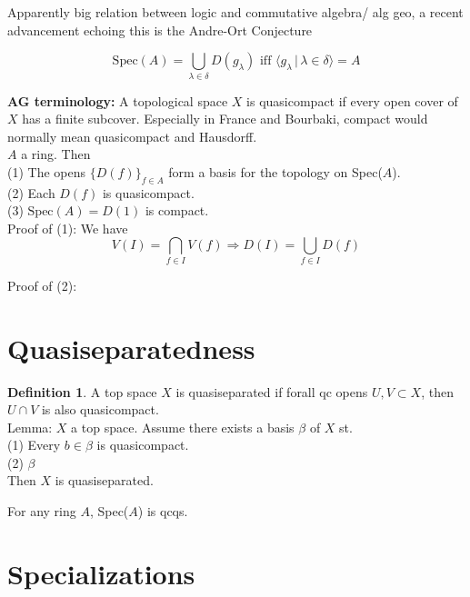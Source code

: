 \documentclass{article}
\theoremstyle{definition}
\theoremstyle{definition}
\newtheorem{definition}{Definition}[section]
\theoremstyle{remark}
\newcommand{\ic}{\cap}
\begin{document}
Apparently big relation between logic and commutative algebra/ alg geo, a recent advancement echoing this is the Andre-Ort Conjecture

\begin{coroll}{}{}
	\[\text{Spec}(A) = \bigcup_{\lambda \in \delta} D(g_{\lambda}) \text{ iff } \langle g_{\lambda} \, |\, \lambda \in \delta\rangle = A\]
\end{coroll}

\textbf{AG terminology: } A topological space $X$ is quasicompact if every open cover of $X$ has a finite subcover.
Especially in France and Bourbaki, compact would normally mean quasicompact and Hausdorff.\\

$A$ a ring. Then \\
\indent (1) The opens $\{D(f)\}_{f \in A}$ form a basis for the topology on Spec($A$).\\
\indent (2) Each $D(f)$ is quasicompact.\\
\indent (3) $\text{Spec}(A) = D(1)$ is compact.\\

Proof of (1): We have 
	\[V(I) = \bigcap_{f \in I} V(f) \Longrightarrow D(I) = \bigcup_{f \in I} D(f)\]

	Proof of (2): 

\section{Quasiseparatedness}

\begin{definition}
	A top space $X$ is quasiseparated if forall qc opens $U,V \subset X$, then $U \ic V$ is also quasicompact.\\

	Lemma: $X$ a top space. Assume there exists a basis $\beta$ of $X$ st.\\
	(1) Every $b \in \beta$ is quasicompact.\\
	(2) $\beta$\\
Then $X$ is quasiseparated.
\end{definition}

\begin{coroll}{}{}
 For any ring $A$, Spec($A$) is qcqs.
\end{coroll}

\section{Specializations}
\end{document}
